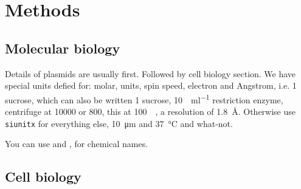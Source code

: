 \section*{Methods}\label{s:methods}

\subsection*{Molecular biology}

Details of plasmids are usually first.
Followed by cell biology section.
We have special units defied for: molar, units, spin speed, electron and Angstrom, i.e. \SI{1}{\Molar} sucrose, which can also be written \SI{1}{\molar} sucrose, \SI{10}{\Units\per\milli\litre} restriction enzyme, centrifuge at \SI{10000}{\gee} or \SI{800}{\rpm}, this at \SI{100}{\kilo\electron}, a resolution of \SI{1.8}{\angstrom}.
Otherwise use \texttt{siunitx} for everything else, \SI{10}{\micro\metre} and \SI{37}{\degreeCelsius} and what-not.

You can use  and , for chemical names.

\subsection*{Cell biology}

\lipsum[80]
